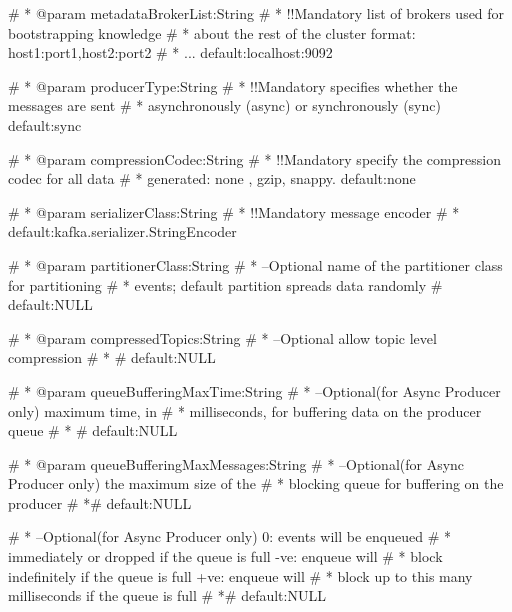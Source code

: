 \documentclass[letterpaper]{book}
\begin{document}
\begin{Arguments}
\begin{ldescription}
\item[\code{metadataBrokerList}] 
\#     * @param metadataBrokerList:String
\#   *            !!Mandatory list of brokers used for bootstrapping knowledge
\#   *            about the rest of the cluster format: host1:port1,host2:port2
\#   *            ... default:localhost:9092

\item[\code{producerType}] 
\#     * @param producerType:String
\#   *            !!Mandatory specifies whether the messages are sent
\#   *            asynchronously (async) or synchronously (sync) default:sync

\item[\code{compressionCodec}] 
\#     * @param compressionCodec:String
\#   *            !!Mandatory specify the compression codec for all data
\#   *            generated: none , gzip, snappy. default:none

\item[\code{serializerClass}] 
\#     * @param serializerClass:String
\#   *            !!Mandatory message encoder
\#   *            default:kafka.serializer.StringEncoder

\item[\code{partitionerClass}] 
\#     * @param partitionerClass:String
\#   *            --Optional name of the partitioner class for partitioning
\#   *            events; default partition spreads data randomly
\#               default:NULL

\item[\code{compressedTopics}] 
\#     * @param compressedTopics:String
\#   *            --Optional allow topic level compression
\#   * \#               default:NULL

\item[\code{queueBufferingMaxTime}] 
\#     * @param queueBufferingMaxTime:String
\#   *            --Optional(for Async Producer only) maximum time, in
\#   *            milliseconds, for buffering data on the producer queue
\#   * \#               default:NULL

\item[\code{queueBufferingMaxMessages}] 
\#     * @param queueBufferingMaxMessages:String
\#   *            --Optional(for Async Producer only) the maximum size of the
\#   *            blocking queue for buffering on the producer
\#   *\#               default:NULL

\item[\code{queueEnqueueTimeoutTime}] 
\#   *            --Optional(for Async Producer only) 0: events will be enqueued
\#   *            immediately or dropped if the queue is full -ve: enqueue will
\#   *            block indefinitely if the queue is full +ve: enqueue will
\#   *            block up to this many milliseconds if the queue is full
\#   *\#               default:NULL


\end{ldescription}
\end{Arguments}
\end{document}
